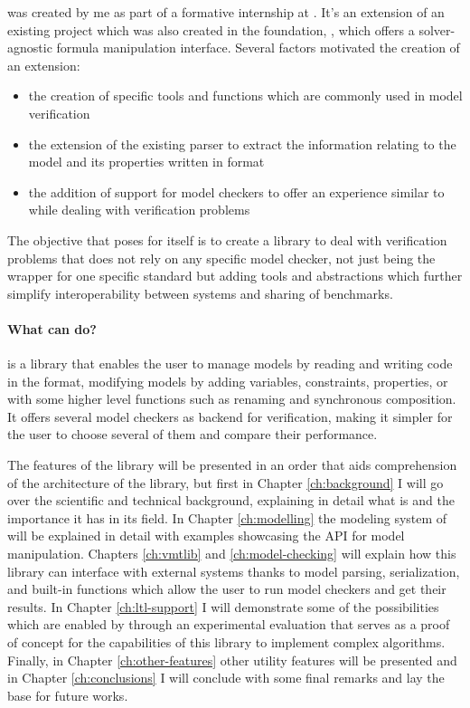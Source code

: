 \pyvmt{} was created by me as part of a formative internship at \FBK{}. It's an extension of an existing project which was also created in the foundation, \pysmt{}, which offers a solver-agnostic formula manipulation interface.
Several factors motivated the creation of an extension:
\begin{itemize}
  \item the creation of specific tools and functions which are commonly used in model verification
  \item the extension of the existing \smtlib{} parser to extract the information relating to the model and its properties written in \vmtlib{} format
  \item the addition of support for model checkers to offer an experience similar to \pysmt{} while dealing with verification problems
\end{itemize}

The objective that \pyvmt{} poses for itself is to create a library to deal with verification problems that does not rely on any specific model checker, not just being the wrapper for one specific standard but adding tools and abstractions which further simplify interoperability between systems and sharing of benchmarks.

\paragraph*{What can \pyvmt{} do?}
\pyvmt{} is a \python{} library that enables the user to manage \vmt{} models by reading and writing code in the \vmtlib{} format, modifying models by adding variables, constraints, properties, or with some higher level functions such as renaming and synchronous composition. It offers several model checkers as backend for verification, making it simpler for the user to choose several of them and compare their performance.

The features of the library will be presented in an order that aids comprehension of the architecture of the library, but first in Chapter \ref{ch:background} I will go over the scientific and technical background, explaining in detail what \pysmt{} is and the importance it has in its field.
In Chapter \ref{ch:modelling} the modeling system of \pyvmt{} will be explained in detail with examples showcasing the API for model manipulation.
Chapters \ref{ch:vmtlib} and \ref{ch:model-checking} will explain how this library can interface with external systems thanks to model parsing, serialization, and built-in functions which allow the user to run model checkers and get their results.
In Chapter \ref{ch:ltl-support} I will demonstrate some of the possibilities which are enabled by \pyvmt{} through an experimental evaluation that serves as a proof of concept for the capabilities of this library to implement complex algorithms.
Finally, in Chapter \ref{ch:other-features} other utility features will be presented and in Chapter \ref{ch:conclusions} I will conclude with some final remarks and lay the base for future works.

